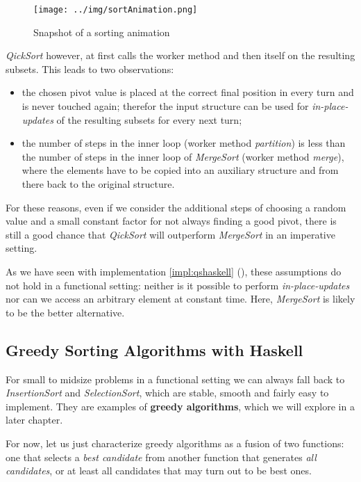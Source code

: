 \begin{figure}[ht]
\centering
\texttt{[image: ../img/sortAnimation.png]}
\caption[Sorting in Action]{Snapshot of a sorting animation}
\end{figure}

\emph{QickSort} however, at first calls the worker method and then itself on the resulting subsets.
This leads to two observations:
\begin{itemize}
    \item the chosen pivot value is placed at the correct final position in every turn and is never touched again; therefor the input structure can be used for \emph{in-place-updates} of the resulting subsets for every next turn;
    \item the number of steps in the inner loop (worker method \emph{partition}) is less than the number of steps in the inner loop of \emph{MergeSort} (worker method \emph{merge}), where the elements have to be copied into an auxiliary structure and from there back to the original structure.
\end{itemize}

For these reasons, even if we consider the additional steps of choosing a random value and a small constant factor for not always finding a good pivot, there is still a good chance that \emph{QickSort} will outperform \emph{MergeSort} in an imperative setting.

As we have seen with implementation \ref{impl:qshaskell} (), these assumptions do not hold in a functional setting: neither is it possible to perform \emph{in-place-updates} nor can we access an arbitrary element at constant time.
Here, \emph{MergeSort} is likely to be the better alternative. 

\subsection{Greedy Sorting Algorithms with Haskell}

For small to midsize problems in a functional setting we can always fall back to \emph{InsertionSort} and \emph{SelectionSort}, which are stable, smooth and fairly easy to implement.
They are examples of \textbf{greedy algorithms}, which we will explore in a later chapter.

For now, let us just characterize greedy algorithms as a fusion of two functions: one that selects a \emph{best candidate} from another function that generates \emph{all candidates}, or at least all candidates that may turn out to be best ones.

